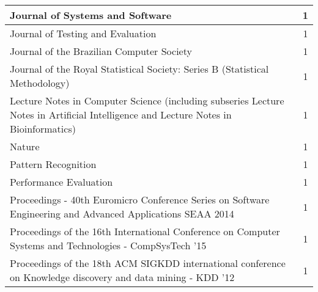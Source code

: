 \begin{longtable}{|p{11cm}|c|}
	Journal of Systems and Software                                                                                                                                                         & 1        \\ \hline
	Journal of Testing and Evaluation                                                                                                                                                       & 1        \\ \hline
	Journal of the Brazilian Computer Society                                                                                                                                               & 1        \\ \hline
	Journal of the Royal Statistical Society: Series B (Statistical Methodology)                                                                                                            & 1        \\ \hline
	Lecture Notes in Computer Science (including subseries Lecture Notes in Artificial Intelligence and Lecture Notes in Bioinformatics)                                                    & 1        \\ \hline
	Nature                                                                                                                                                                                  & 1        \\ \hline
	Pattern Recognition                                                                                                                                                                     & 1        \\ \hline
	Performance Evaluation                                                                                                                                                                  & 1        \\ \hline
	Proceedings - 40th Euromicro Conference Series on Software Engineering and Advanced Applications SEAA 2014                                                                              & 1        \\ \hline
	Proceedings of the 16th International Conference on Computer Systems and Technologies - CompSysTech '15                                                                                 & 1        \\ \hline
	Proceedings of the 18th ACM SIGKDD international conference on Knowledge discovery and data mining - KDD '12                                                                            & 1        \\ \hline

\end{longtable}
